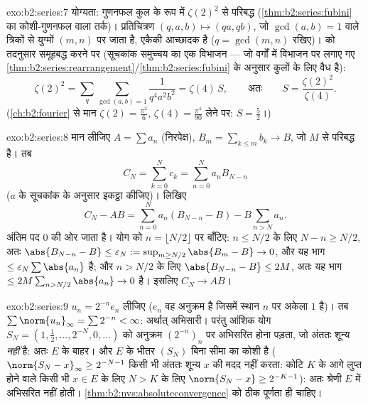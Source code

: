 \begin{solution}{exo:b2:series:7}
योग्यता: गुणनफल कुल के रूप में $\zeta(2)^2$ से परिबद्ध (\cref{thm:b2:series:fubini} का कोशी-गुणनफल वाला
तर्क)। प्रतिचित्रण $(q, a, b) \mapsto (qa, qb)$, जो $\gcd(a, b) = 1$ वाले त्रिकों से युग्मों $(m, n)$ पर जाता है,
एकैकी आच्छादक है ($q = \gcd(m,n)$ रखिए)।  को तदनुसार समूहबद्ध करने पर
(सूचकांक समुच्चय का एक विभाजन --- जो  वर्गों में विभाजन पर लगाए गए
\cref{thm:b2:series:rearrangement}/\cref{thm:b2:series:fubini} के अनुसार  कुलों के लिए वैध है):
\[
\zeta(2)^2 = \sum_{q} \sum_{\gcd(a,b)=1} \frac{1}{q^4 a^2 b^2}
= \zeta(4)\, S,
\qquad\text{अतः}\qquad
S = \frac{\zeta(2)^2}{\zeta(4)} .
\]
(\cref{ch:b2:fourier} से मान $\zeta(2) = \frac{\pi^2}{6}$, $\zeta(4) = \frac{\pi^4}{90}$ लेने पर: $S = \frac{5}{2}$।)
\end{solution}

\begin{solution}{exo:b2:series:8}
मान लीजिए $A = \sum a_n$ (निरपेक्ष), $B_m = \sum_{k\leq m} b_k \to B$, जो $M$ से परिबद्ध है। तब
\[
C_N = \sum_{k=0}^{N} c_k = \sum_{n=0}^{N} a_n B_{N-n}
\]
($a$ के सूचकांक के अनुसार इकट्ठा कीजिए)। लिखिए
\[
C_N - AB = \sum_{n=0}^{N} a_n (B_{N-n} - B) - B\sum_{n > N} a_n .
\]
अंतिम पद $0$ की ओर जाता है। योग को $n = \lfloor N/2
\rfloor$ पर बाँटिए: $n \leq N/2$ के लिए $N - n \geq N/2$, अतः
$\abs{B_{N-n} - B}
\leq \varepsilon_N := \sup_{m \geq N/2}\abs{B_m - B} \to 0$, और यह भाग $\leq \varepsilon_N \sum\abs{a_n}$ है; और $n > N/2$ के लिए $\abs{B_{N-n} - B} \leq 2M$, अतः यह भाग $\leq 2M \sum_{n >
N/2} \abs{a_n} \to 0$ है।
इसलिए $C_N \to AB$।
\end{solution}

\begin{solution}{exo:b2:series:9}
$u_n = 2^{-n} e_n$ लीजिए ($e_n$ वह अनुक्रम है जिसमें स्थान $n$ पर अकेला $1$ है)। तब $\sum \norm{u_n}_\infty = \sum 2^{-n} <
\infty$:
अर्थात्  अभिसारी। परंतु आंशिक योग $S_N =
(1, \tfrac12, \dots, 2^{-N}, 0, \dots)$ को अनुक्रम $(2^{-n})_n$ पर
अभिसरित होना पड़ता, जो अंततः शून्य \emph{नहीं} है: अतः $E$ के बाहर। और
$E$ के भीतर $(S_N)$ बिना सीमा का कोशी है ($\norm{S_N
- x}_\infty \geq 2^{-N-1}$ किसी भी अंततः शून्य $x$ की
मदद नहीं करता: कोटि $K$ के आगे लुप्त होने वाले किसी भी $x \in E$ के लिए $N > K$
के लिए $\norm{S_N - x} \geq
2^{-K-1}$): अतः श्रेणी $E$ में अभिसरित नहीं होती। \cref{thm:b2:nvs:absoluteconvergence} को ठीक पूर्णता
ही चाहिए।
\end{solution}

